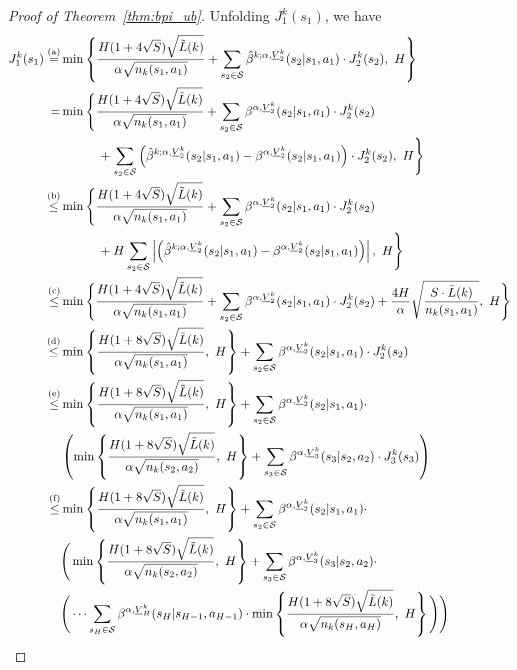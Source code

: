\begin{proof}[Proof of Theorem~\ref{thm:bpi_ub}]
	Unfolding $J^k_1(s_1)$, we have
	\begin{align*}
		J^k_1(s_1) \overset{\textup{(a)}}{=} & \min \lbr{\frac{H(1+4\sqrt{S})\sqrt{\tilde{L}(k)}}{\alpha  \sqrt{n_k(s_1,a_1)}}+ \sum_{s_2 \in \cS} \hat{\beta}^{k;\alpha,\underline{V}^k_{2}}(s_2|s_1,a_1) \cdot J^k_{2}(s_2),\ H }
		\\
		= & \min \Bigg\{\frac{H(1+4\sqrt{S})\sqrt{\tilde{L}(k)}}{\alpha  \sqrt{n_k(s_1,a_1)}}+ \sum_{s_2 \in \cS} \beta^{\alpha,\underline{V}^k_{2}}(s_2|s_1,a_1) \cdot J^k_{2}(s_2) \\& \qquad \quad + \sum_{s_2 \in \cS} \sbr{\hat{\beta}^{k;\alpha,\underline{V}^k_{2}}(s_2|s_1,a_1) - \beta^{\alpha,\underline{V}^k_{2}}(s_2|s_1,a_1)} \cdot J^k_{2}(s_2),\ H \Bigg\}
		\\
		\overset{\textup{(b)}}{\leq} & \min \Bigg\{\frac{H(1+4\sqrt{S})\sqrt{\tilde{L}(k)}}{\alpha  \sqrt{n_k(s_1,a_1)}}+ \sum_{s_2 \in \cS} \beta^{\alpha,\underline{V}^k_{2}}(s_2|s_1,a_1) \cdot J^k_{2}(s_2) \\& \qquad \quad + H \sum_{s_2 \in \cS} \abr{\sbr{\hat{\beta}^{k;\alpha,\underline{V}^k_{2}}(s_2|s_1,a_1) - \beta^{\alpha,\underline{V}^k_{2}}(s_2|s_1,a_1)}},\ H \Bigg\}
		\\
		\overset{\textup{(c)}}{\leq} & \min \Bigg\{\frac{H(1+4\sqrt{S})\sqrt{\tilde{L}(k)}}{\alpha  \sqrt{n_k(s_1,a_1)}}+ \sum_{s_2 \in \cS} \beta^{\alpha,\underline{V}^k_{2}}(s_2|s_1,a_1) \cdot J^k_{2}(s_2) + \frac{4H}{\alpha} \sqrt{\frac{S \cdot \tilde{L}(k)}{n_k(s_1,a_1)}},\ H \Bigg\}
		\\
		\overset{\textup{(d)}}{\leq} & \min \lbr{\frac{H(1+8\sqrt{S})\sqrt{\tilde{L}(k)}}{\alpha  \sqrt{n_k(s_1,a_1)}},\ H } +\sum_{s_2 \in \cS} \beta^{\alpha,\underline{V}^k_{2}}(s_2|s_1,a_1) \cdot J^k_{2}(s_2)
		\\
		\overset{\textup{(e)}}{\leq} & \min \lbr{\frac{H(1+8\sqrt{S})\sqrt{\tilde{L}(k)}}{\alpha  \sqrt{n_k(s_1,a_1)}},\ H } +\sum_{s_2 \in \cS} \beta^{\alpha,\underline{V}^k_{2}}(s_2|s_1,a_1) \cdot \\& \sbr{ \min \lbr{\frac{H(1+8\sqrt{S})\sqrt{\tilde{L}(k)}}{\alpha  \sqrt{n_k(s_2,a_2)}},\ H } +\sum_{s_3 \in \cS} \beta^{\alpha,\underline{V}^k_{3}}(s_3|s_2,a_2) \cdot J^k_{3}(s_3) }
		\\
		\overset{\textup{(f)}}{\leq} & \min \lbr{\frac{H(1+8\sqrt{S})\sqrt{\tilde{L}(k)}}{\alpha  \sqrt{n_k(s_1,a_1)}},\ H } +\sum_{s_2 \in \cS} \beta^{\alpha,\underline{V}^k_{2}}(s_2|s_1,a_1) \cdot \\& \Bigg( \min \lbr{\frac{H(1+8\sqrt{S})\sqrt{\tilde{L}(k)}}{\alpha  \sqrt{n_k(s_2,a_2)}},\ H } +\sum_{s_3 \in \cS} \beta^{\alpha,\underline{V}^k_{3}}(s_3|s_2,a_2) \cdot \\& \Bigg( \dots \sum_{s_H \in \cS} \beta^{\alpha,\underline{V}^k_{H}}(s_H|s_{H-1},a_{H-1}) \cdot \min \lbr{\frac{H(1+8\sqrt{S})\sqrt{\tilde{L}(k)}}{\alpha  \sqrt{n_k(s_H,a_H)}},\ H } \Bigg) \Bigg) 

\end{align*}
\end{proof}
